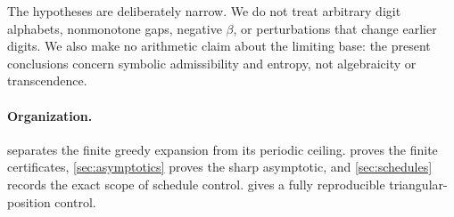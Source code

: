 The hypotheses are deliberately narrow.  We do not treat arbitrary digit alphabets, nonmonotone gaps, negative $\beta$, or perturbations that change earlier digits.  We also make no arithmetic claim about the limiting base: the present conclusions concern symbolic admissibility and entropy, not algebraicity or transcendence.

\paragraph{Organization.}
 separates the finite greedy expansion from its periodic ceiling.   proves the finite certificates, \cref{sec:asymptotics} proves the sharp asymptotic, and \cref{sec:schedules} records the exact scope of schedule control.   gives a fully reproducible triangular-position control.
